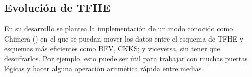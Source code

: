 \subsection{Evolución de TFHE}

En su desarrollo se plantea la implementación de un modo conocido como Chimera (\cite{boura_chimera:_2018}) en el que se puedan mover los datos entre el esquema de TFHE y esquemas más eficientes como BFV, CKKS; y viceversa, sin tener que descifrarlos. Por ejemplo, esto puede ser útil para trabajar con muchas puertas lógicas y hacer alguna operación aritmética rápida entre medias.
